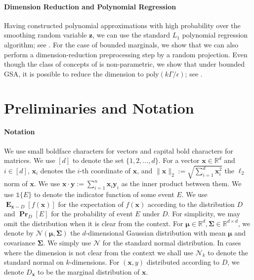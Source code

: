 \documentclass{theoretics}
\renewcommand\vec[1]{\mathbf{#1}}
\DeclareMathOperator*{\pr}{\mathbf{Pr}}
\DeclareMathOperator*{\E}{\mathbf{E}}
\newcommand{\normal}{\mathcal{N}}
\newcommand{\R}{\mathbb{R}}
\newcommand{\1}{\Ind}
\begin{document}
\paragraph{Dimension Reduction and Polynomial Regression}

Having constructed polynomial approximations with high probability over the smoothing random variable $\mathbf{z}$, we can use the standard $L_1$ polynomial regression algorithm; see \cite{KKMS:05,KOS:08}. For the case of bounded marginals, we show that we can also perform a dimension-reduction preprocessing step by a random projection. Even though the class of concepts of  is non-parametric, we show that under bounded GSA, it is possible to reduce the dimension to $\text{poly}(k \Gamma/\epsilon)$; see . 

\section{Preliminaries and Notation}
\paragraph{Notation}
We use small boldface characters for vectors and capital bold characters for matrices.
We use $[d]$ to denote the set $\{1, 2, \ldots, d\}$.
For a vector $\vec x \in \R^d$ and $i \in [d]$, $\vec x_i$ denotes the $i$-th coordinate of $\vec x$, and $\|\vec x\|_2 := \sqrt{ \sum_{i=1}^d \vec x_i^2 }$ the $\ell_2$ norm of $\vec x$.
We use $\vec x \cdot \vec y := \sum_{i=1}^n \vec x_i  \vec y_i$ as the inner product between them. We use $\mathds 1\{ E  \}$  to denote the indicator function of some event $E$.  We use $\E_{\vec x \sim D}[f(\vec x)]$ for the expectation of $f(\vec x)$ according to the distribution $D$ and $\pr_D[E]$ for the probability of event $E$ under $D$. For simplicity, we may omit the distribution when it is clear from the context. %
For $\vec \mu \in \R^d, \vec \Sigma \in \R^{d \times d}$, we denote by $\normal (\vec \mu, \vec \Sigma)$  the $d$-dimensional Gaussian distribution
with mean $\vec \mu$ and covariance $\vec \Sigma$.  We simply use $\mathcal N$
for the standard normal distribution.  In cases where the dimension is not clear from the context we shall use $\mathcal{N}_k$ to denote the standard normal on $k$-dimensions.
For $(\vec x, y)$ distributed according to $D$, we denote $D_{\vec x}$
to be the marginal distribution of $\vec x$.
\end{document}
